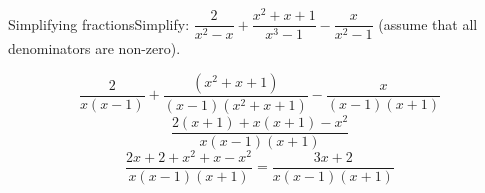 \begin{wex}{Simplifying fractions}{Simplify: $\dfrac{2}{{x}^{2}-x}+\dfrac{x^{2}+x+1}{x^{3}-1}-\dfrac{x}{{x}^{2}-1}$ 
(assume that all denominators are non-zero).}
{
\begin{equation*}
\dfrac{2}{x(x-1)}+ \dfrac{({x}^{2} + x + 1)}{(x-1)(x^{2}+x+1)}-\dfrac{x}{(x-1)(x+1)}
\end{equation*}
\begin{equation*}
\dfrac{2(x+1)+x(x+1)-x^{2}}{x(x-1)(x+1)}
\end{equation*}
\begin{equation*}
\dfrac{2x+2 + x^{2} + x - x^{2}}{x(x-1)(x+1)} = \dfrac{3x+2}{x(x-1)(x+1)}
\end{equation*}

}
\end{wex}


